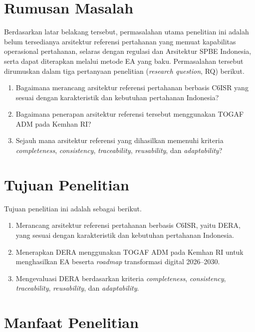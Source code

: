 \section{Rumusan Masalah}
\label{sec:I.2}

Berdasarkan latar belakang tersebut, permasalahan utama penelitian ini adalah belum tersedianya arsitektur referensi pertahanan yang memuat kapabilitas operasional pertahanan, selaras dengan regulasi dan Arsitektur SPBE Indonesia, serta dapat diterapkan melalui metode EA yang baku. Permasalahan tersebut dirumuskan dalam tiga pertanyaan penelitian (\textit{research question}, RQ\label{sk:RQ}) berikut.

\begin{enumerate}[label=RQ\arabic*:, leftmargin=*]
\item Bagaimana merancang arsitektur referensi pertahanan berbasis C6ISR yang sesuai dengan karakteristik dan kebutuhan pertahanan Indonesia?
\item Bagaimana penerapan arsitektur referensi tersebut menggunakan TOGAF ADM pada Kemhan RI?
\item Sejauh mana arsitektur referensi yang dihasilkan memenuhi kriteria \textit{completeness}, \textit{consistency}, \textit{traceability}, \textit{reusability}, dan \textit{adaptability}?
\end{enumerate}

\section{Tujuan Penelitian}
\label{sec:I.3}

Tujuan penelitian ini adalah sebagai berikut.

\begin{enumerate}[label=\arabic*.]
\item Merancang arsitektur referensi pertahanan berbasis C6ISR, yaitu DERA, yang sesuai dengan karakteristik dan kebutuhan pertahanan Indonesia.
\item Menerapkan DERA menggunakan TOGAF ADM pada Kemhan RI untuk menghasilkan EA beserta \textit{roadmap} transformasi digital 2026–2030.
\item Mengevaluasi DERA berdasarkan kriteria \textit{completeness}, \textit{consistency}, \textit{traceability}, \textit{reusability}, dan \textit{adaptability}.
\end{enumerate}

\section{Manfaat Penelitian}
\label{sec:I.4}

